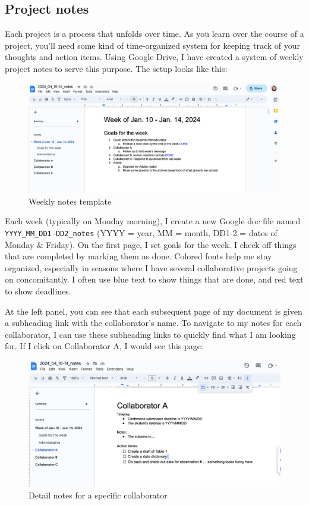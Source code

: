 \documentclass[
]{book}
\begin{document}
\hypertarget{project-notes-1}{%
\subsection{Project notes}\label{project-notes-1}}

Each project is a process that unfolds over time. As you learn over the course of a project, you'll need some kind of time-organized system for keeping track of your thoughts and action items. Using Google Drive, I have created a system of weekly project notes to serve this purpose. The setup looks like this:

\begin{figure}
\centering
\includegraphics{img/weekly_notes.png}
\caption{Weekly notes template}
\end{figure}

Each week (typically on Monday morning), I create a new Google doc file named \texttt{YYYY\_MM\_DD1-DD2\_notes} (YYYY = year, MM = month, DD1-2 = dates of Monday \& Friday). On the first page, I set goals for the week. I check off things that are completed by marking them as done. Colored fonts help me stay organized, especially in seasons where I have several collaborative projects going on concomitantly. I often use blue text to show things that are done, and red text to show deadlines.

At the left panel, you can see that each subsequent page of my document is given a subheading link with the collaborator's name. To navigate to my notes for each collaborator, I can use these subheading links to quickly find what I am looking for. If I click on Collaborator A, I would see this page:

\begin{figure}
\centering
\includegraphics{img/weekly_notes2.png}
\caption{Detail notes for a specific collaborator}
\end{figure}
\end{document}
